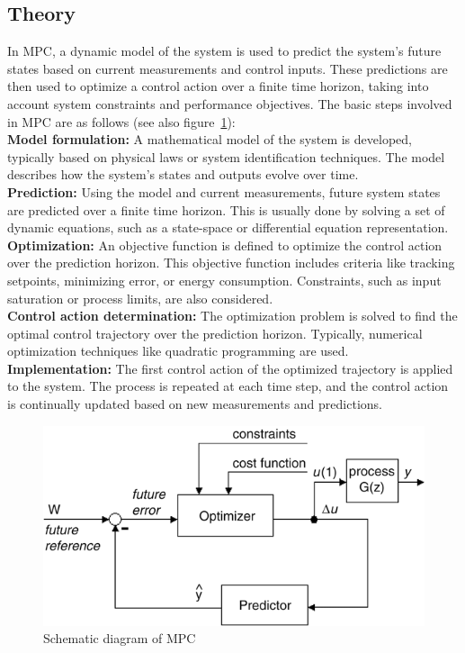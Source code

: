 \documentclass{LTHtwocol} %
\begin{document}
\subsection{Theory}
In MPC, a dynamic model of the system is used to predict the system's future states based on current measurements and control inputs. These predictions are then used to optimize a control action over a finite time horizon, taking into account system constraints and performance objectives. The basic steps involved in MPC are as follows (see also figure~\ref{fig:MPCdiag}):\\
\textbf{Model formulation:} A mathematical model of the system is developed, typically based on physical laws or system identification techniques. The model describes how the system's states and outputs evolve over time.\\
\textbf{Prediction:} Using the model and current measurements, future system states are predicted over a finite time horizon. This is usually done by solving a set of dynamic equations, such as a state-space or differential equation representation.\\
\textbf{Optimization:} An objective function is defined to optimize the control action over the prediction horizon. This objective function includes criteria like tracking setpoints, minimizing error, or energy consumption. Constraints, such as input saturation or process limits, are also considered.\\
\textbf{Control action determination:} The optimization problem is solved to find the optimal control trajectory over the prediction horizon. Typically, numerical optimization techniques like quadratic programming are used.\\
\textbf{Implementation:} The first control action of the optimized trajectory is applied to the system. The process is repeated at each time step, and the control action is continually updated based on new measurements and predictions.

\begin{figure}[t]
	\centering
	\includegraphics[width=0.9\columnwidth]{pic/MPCdiagram.png}
	\caption{Schematic diagram of MPC}
	\label{fig:MPCdiag} 
\end{figure}
\end{document}
